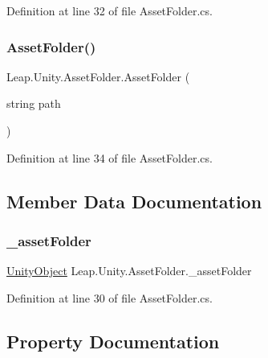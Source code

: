 Definition at line 32 of file Asset\+Folder.\+cs.

\mbox{\label{class_leap_1_1_unity_1_1_asset_folder_ab6ef19c5ea98ce992488456b44fc5682}} 
\subsubsection{\texorpdfstring{AssetFolder()}{AssetFolder()}\hspace{0.1cm}{\footnotesize\ttfamily [2/2]}}
{\footnotesize\ttfamily Leap.\+Unity.\+Asset\+Folder.\+Asset\+Folder (\begin{DoxyParamCaption}\item[{string}]{path }\end{DoxyParamCaption})}



Definition at line 34 of file Asset\+Folder.\+cs.



\subsection{Member Data Documentation}
\mbox{\label{class_leap_1_1_unity_1_1_asset_folder_a688ea58c08ad71b09caeb1e46abb355f}} 
\subsubsection{\texorpdfstring{\_assetFolder}{\_assetFolder}}
{\footnotesize\ttfamily \mbox{\hyperlink{namespace_leap_1_1_unity_1_1_attributes_a71d15e38cb19d7d2ffb1aa310ce8f0f9}{Unity\+Object}} Leap.\+Unity.\+Asset\+Folder.\+\_\+asset\+Folder\hspace{0.3cm}{\ttfamily [protected]}}



Definition at line 30 of file Asset\+Folder.\+cs.



\subsection{Property Documentation}
\mbox{\label{class_leap_1_1_unity_1_1_asset_folder_ac67aee1b93835ce53ca986c6e800532b}} 
